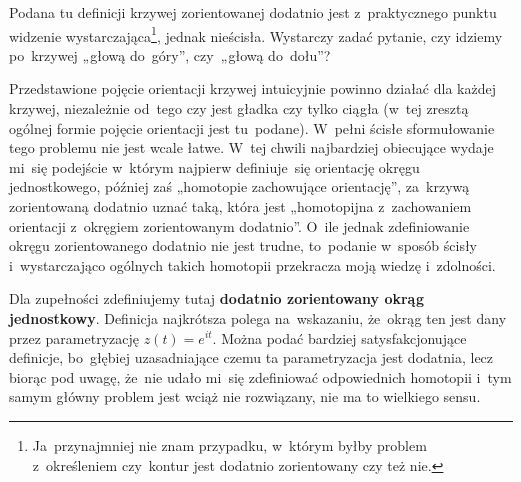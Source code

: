 \documentclass[a4paper,11pt]{article}
\numberwithin{equation}{section}
\begin{document}
\VerSpaceFour





\noindent
{} Podana tu definicji krzywej zorientowanej dodatnio jest
z~praktycznego punktu widzenie wystarczająca\footnote{Ja~przynajmniej nie
  znam przypadku, w~którym byłby problem z~określeniem czy~kontur jest
  dodatnio zorientowany czy też nie.}, jednak nieścisła. Wystarczy zadać
pytanie, czy idziemy po~krzywej „głową do~góry”, czy~„głową do~dołu”?

Przedstawione pojęcie orientacji krzywej intuicyjnie powinno działać
dla każdej krzywej, niezależnie od~tego czy jest gładka czy tylko
ciągła (w~tej zresztą ogólnej formie pojęcie orientacji jest
tu~podane). W~pełni ścisłe sformułowanie tego problemu nie jest wcale
łatwe. W~tej chwili najbardziej obiecujące wydaje mi~się podejście
w~którym najpierw definiuje~się orientację okręgu jednostkowego,
później zaś „homotopie zachowujące orientację”, za~krzywą zorientowaną
dodatnio uznać taką, która jest „homotopijna z~zachowaniem orientacji
z~okręgiem zorientowanym dodatnio”. O~ile jednak zdefiniowanie okręgu
zorientowanego dodatnio nie jest trudne, to~podanie w~sposób ścisły
i~wystarczająco ogólnych takich homotopii przekracza moją wiedzę
i~zdolności.

Dla zupełności zdefiniujemy tutaj \textbf{dodatnio zorientowany okrąg
  jednostkowy}. Definicja najkrótsza polega na~wskazaniu, że~okrąg ten
jest dany przez parametryzację $z( t ) = e^{ i t }$. Można podać
bardziej satysfakcjonujące definicje, bo~głębiej uzasadniające czemu
ta parametryzacja jest dodatnia, lecz biorąc pod uwagę, że~nie udało
mi~się zdefiniować odpowiednich homotopii i~tym samym główny problem
jest wciąż nie rozwiązany, nie ma to wielkiego sensu.

\VerSpaceFour
\end{document}
